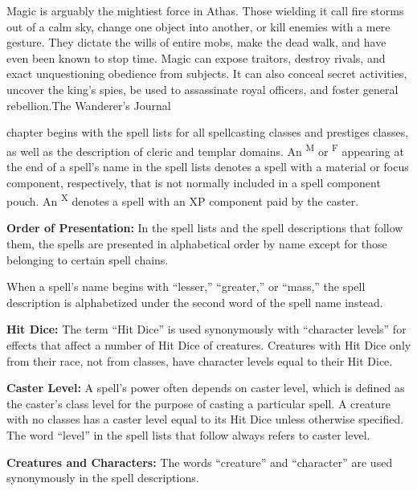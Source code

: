 {Magic is arguably the mightiest force in Athas. Those wielding it call fire storms out of a calm sky, change one object into another, or kill enemies with a mere gesture. They dictate the wills of entire mobs, make the dead walk, and have even been known to stop time. Magic can expose traitors, destroy rivals, and exact unquestioning obedience from subjects. It can also conceal secret activities, uncover the king's spies, be used to assassinate royal officers, and foster general rebellion.}{The Wanderer's Journal}

 chapter begins with the spell lists for all spellcasting classes and prestiges classes, as well as the description of cleric and templar domains. An \textsuperscript{M} or \textsuperscript{F} appearing at the end of a spell's name in the spell lists denotes a spell with a material or focus component, respectively, that is not normally included in a spell component pouch. An \textsuperscript{X} denotes a spell with an XP component paid by the caster.

\textbf{Order of Presentation:} In the spell lists and the spell descriptions that follow them, the spells are presented in alphabetical order by name except for those belonging to certain spell chains.

When a spell's name begins with ``lesser,'' ``greater,'' or ``mass,'' the spell description is alphabetized under the second word of the spell name instead.

\textbf{Hit Dice:} The term ``Hit Dice'' is used synonymously with ``character levels'' for effects that affect a number of Hit Dice of creatures. Creatures with Hit Dice only from their race, not from classes, have character levels equal to their Hit Dice.

\textbf{Caster Level:} A spell's power often depends on caster level, which is defined as the caster's class level for the purpose of casting a particular spell. A creature with no classes has a caster level equal to its Hit Dice unless otherwise specified. The word ``level'' in the spell lists that follow always refers to caster level.

\textbf{Creatures and Characters:} The words ``creature'' and ``character'' are used synonymously in the spell descriptions.

